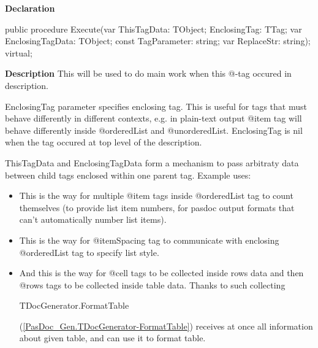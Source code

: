 \documentclass{report}
\newif\ifpdf
\begin{document}
\label{PasDoc_TagManager.TTag-Execute}
\begin{list}{}{
\setlength{\itemindent}{0cm}
\setlength{\listparindent}{0cm}
\setlength{\leftmargin}{\evensidemargin}
\addtolength{\leftmargin}{\tmplength}
\settowidth{\labelsep}{X}
\addtolength{\leftmargin}{\labelsep}
\setlength{\labelwidth}{\tmplength}
}
\item[\textbf{Declaration}\hfill]
\ifpdf
\begin{flushleft}
\fi
\begin{ttfamily}
public procedure Execute(var ThisTagData: TObject; EnclosingTag: TTag; var EnclosingTagData: TObject; const TagParameter: string; var ReplaceStr: string); virtual;\end{ttfamily}

\ifpdf
\end{flushleft}
\fi

\par
\item[\textbf{Description}]
This will be used to do main work when this @{-}tag occured in description.

EnclosingTag parameter specifies enclosing tag. This is useful for tags that must behave differently in different contexts, e.g. in plain{-}text output @item tag will behave differently inside @orderedList and @unorderedList. EnclosingTag is nil when the tag occured at top level of the description.

ThisTagData and EnclosingTagData form a mechanism to pass arbitraty data between child tags enclosed within one parent tag. Example uses:

\begin{itemize}
\item This is the way for multiple @item tags inside @orderedList tag to count themselves (to provide list item numbers, for pasdoc output formats that can't automatically number list items).
\item This is the way for @itemSpacing tag to communicate with enclosing @orderedList tag to specify list style. 
\item And this is the way for @cell tags to be collected inside rows data and then @rows tags to be collected inside table data. Thanks to such collecting \begin{ttfamily}TDocGenerator.FormatTable\end{ttfamily}(\ref{PasDoc_Gen.TDocGenerator-FormatTable}) receives at once all information about given table, and can use it to format table.
\end{itemize}


\end{list}
\end{document}
